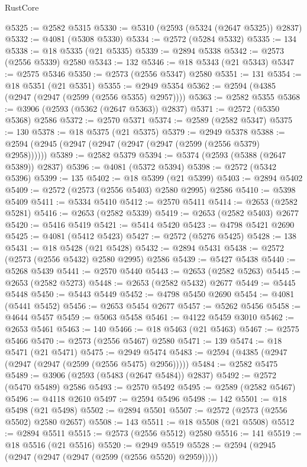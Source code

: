\begin{lexlean}{RustCore}
\begin{coremodule}
@5325 := @2582 @5315
@5330 := @5310 (@2593 (@5324 (@2647 @5325)) @2837)
@5332 := @4081 (@5308 @5330)
@5334 := @2572 (@5284 @5332)
@5335 := 134
@5338 := @18 @5335 (@21 @5335)
@5339 := @2894 @5338
@5342 := @2573 (@2556 @5339) @2580
@5343 := 132
@5346 := @18 @5343 (@21 @5343)
@5347 := @2575 @5346
@5350 := @2573 (@2556 @5347) @2580
@5351 := 131
@5354 := @18 @5351 (@21 @5351)
@5355 := @2949 @5354
@5362 := @2594 (@4385 (@2947 (@2947 (@2599 (@2556 @5355) @2957))))
@5363 := @2582 @5355
@5368 := @3906 (@2593 (@5362 (@2647 @5363)) @2837)
@5371 := @2572 (@5350 @5368) @2586
@5372 := @2570 @5371
@5374 := @2589 (@2582 @5347)
@5375 := 130
@5378 := @18 @5375 (@21 @5375)
@5379 := @2949 @5378
@5388 := @2594 (@2945 (@2947 (@2947 (@2947 (@2947 (@2599 (@2556 @5379) @2958))))))
@5389 := @2582 @5379
@5394 := @5374 (@2593 (@5388 (@2647 @5389)) @2837)
@5396 := @4081 (@5372 @5394)
@5398 := @2572 (@5342 @5396)
@5399 := 135
@5402 := @18 @5399 (@21 @5399)
@5403 := @2894 @5402
@5409 := @2572 (@2573 (@2556 @5403) @2580 @2995) @2586
@5410 := @5398 @5409
@5411 := @5334 @5410
@5412 := @2570 @5411
@5414 := @2653 (@2582 @5281)
@5416 := @2653 (@2582 @5339)
@5419 := @2653 (@2582 @5403) @2677
@5420 := @5416 @5419
@5421 := @5414 @5420
@5423 := @4798 @5421 @2690
@5425 := @4081 (@5412 @5423)
@5427 := @2572 (@5276 @5425)
@5428 := 138
@5431 := @18 @5428 (@21 @5428)
@5432 := @2894 @5431
@5438 := @2572 (@2573 (@2556 @5432) @2580 @2995) @2586
@5439 := @5427 @5438
@5440 := @5268 @5439
@5441 := @2570 @5440
@5443 := @2653 (@2582 @5263)
@5445 := @2653 (@2582 @5273)
@5448 := @2653 (@2582 @5432) @2677
@5449 := @5445 @5448
@5450 := @5443 @5449
@5452 := @4798 @5450 @2690
@5454 := @4081 (@5441 @5452)
@5456 := @2653 @5454 @2677
@5457 := @5262 @5456
@5458 := @4644 @5457
@5459 := @5063 @5458
@5461 := @4122 @5459 @3010
@5462 := @2653 @5461
@5463 := 140
@5466 := @18 @5463 (@21 @5463)
@5467 := @2575 @5466
@5470 := @2573 (@2556 @5467) @2580
@5471 := 139
@5474 := @18 @5471 (@21 @5471)
@5475 := @2949 @5474
@5483 := @2594 (@4385 (@2947 (@2947 (@2947 (@2599 (@2556 @5475) @2956)))))
@5484 := @2582 @5475
@5489 := @3906 (@2593 (@5483 (@2647 @5484)) @2837)
@5492 := @2572 (@5470 @5489) @2586
@5493 := @2570 @5492
@5495 := @2589 (@2582 @5467)
@5496 := @4118 @2610
@5497 := @2594 @5496
@5498 := 142
@5501 := @18 @5498 (@21 @5498)
@5502 := @2894 @5501
@5507 := @2572 (@2573 (@2556 @5502) @2580 @2657)
@5508 := 143
@5511 := @18 @5508 (@21 @5508)
@5512 := @2894 @5511
@5515 := @2573 (@2556 @5512) @2580
@5516 := 141
@5519 := @18 @5516 (@21 @5516)
@5520 := @2949 @5519
@5528 := @2594 (@2945 (@2947 (@2947 (@2947 (@2599 (@2556 @5520) @2959)))))

\end{coremodule}
\end{lexlean}
